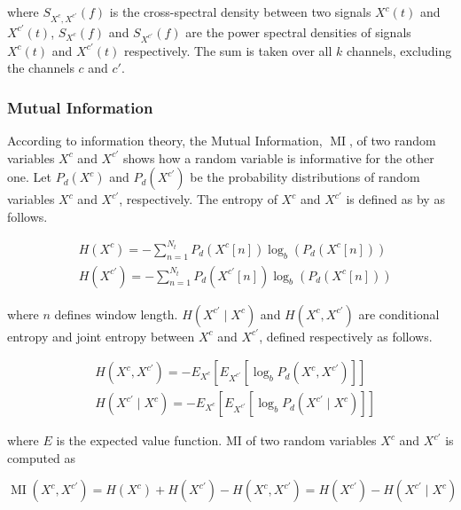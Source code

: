 where $S_{X^{c},X^{c'}}(f)$ is the cross-spectral density between two signals $X^{c}(t)$ and $X^{c'}(t)$, $S_{X^{c}}(f)$ and $S_{X^{c'}}(f)$ are the power spectral densities of signals $X^{c}(t)$ and $X^{c'}(t)$ respectively. The sum is taken over all $k$ channels, excluding the channels $c$ and $c'$. 

\subsubsection{Mutual Information}

According to information theory, the Mutual Information, $\operatorname{MI}$, of two random variables $X^{c}$ and $X^{c'}$ shows how a random variable is informative for the other one. Let $P_d(X^{c})$ and $P_d(X^{c'})$ be the probability distributions of random variables $X^{c}$ and $X^{c'}$, respectively. The entropy of $X^{c}$ and $X^{c'}$ is defined as by \cite{gu2023decoding} as follows.

\begin{equation}
\begin{aligned}
& H(X^{c})=-\sum_{n=1}^{N_t} P_d\left(X^{c}[n]\right) \log _{b}\left(P_d\left(X^{c}[n]\right)\right) \\
& H(X^{c'})=-\sum_{n=1}^{N_t} P_d\left(X^{c'}[n]\right) \log _{b}\left(P_d\left(X^{c}[n]\right)\right)
\end{aligned}
\end{equation}

where $n$ defines window length. $H(X^{c'} \mid X^{c})$ and $H(X^{c}, X^{c'})$ are conditional entropy and joint entropy between $X^{c}$ and $X^{c'}$, defined respectively as follows.

\begin{equation}
\begin{aligned}
& H(X^{c}, X^{c'})=-E_{X^{c}}\left[E_{X^{c'}}\left[\log _{b} P_d(X^{c}, X^{c'})\right]\right] \\
& H(X^{c'} \mid X^{c})=-E_{X^{c}}\left[E_{X^{c'}}\left[\log _{b} P_d(X^{c'} \mid X^{c})\right]\right]
\end{aligned}
\end{equation}

where $E$ is the expected value function. MI of two random variables $X^{c}$ and $X^{c'}$ is computed as 

\begin{equation}
\operatorname{MI}(X^{c}, X^{c'})=H(X^{c})+H(X^{c'})-H(X^{c}, X^{c'})=H(X^{c'})-H(X^{c'} \mid X^{c})
\end{equation}

